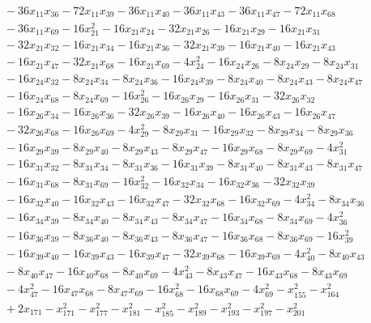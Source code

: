 \begin{align*}
&{}-36x_{11}x_{36} -72x_{11}x_{39} -36x_{11}x_{40} -36x_{11}x_{43} -36x_{11}x_{47} -72x_{11}x_{68} \\
&{}-36x_{11}x_{69} -16x_{21}^{2} -16x_{21}x_{24} -32x_{21}x_{26} -16x_{21}x_{29} -16x_{21}x_{31} \\
&{}-32x_{21}x_{32} -16x_{21}x_{34} -16x_{21}x_{36} -32x_{21}x_{39} -16x_{21}x_{40} -16x_{21}x_{43} \\
&{}-16x_{21}x_{47} -32x_{21}x_{68} -16x_{21}x_{69} -4x_{24}^{2} -16x_{24}x_{26} -8x_{24}x_{29} -8x_{24}x_{31} \\
&{}-16x_{24}x_{32} -8x_{24}x_{34} -8x_{24}x_{36} -16x_{24}x_{39} -8x_{24}x_{40} -8x_{24}x_{43} -8x_{24}x_{47} \\
&{}-16x_{24}x_{68} -8x_{24}x_{69} -16x_{26}^{2} -16x_{26}x_{29} -16x_{26}x_{31} -32x_{26}x_{32} \\
&{}-16x_{26}x_{34} -16x_{26}x_{36} -32x_{26}x_{39} -16x_{26}x_{40} -16x_{26}x_{43} -16x_{26}x_{47} \\
&{}-32x_{26}x_{68} -16x_{26}x_{69} -4x_{29}^{2} -8x_{29}x_{31} -16x_{29}x_{32} -8x_{29}x_{34} -8x_{29}x_{36} \\
&{}-16x_{29}x_{39} -8x_{29}x_{40} -8x_{29}x_{43} -8x_{29}x_{47} -16x_{29}x_{68} -8x_{29}x_{69} -4x_{31}^{2} \\
&{}-16x_{31}x_{32} -8x_{31}x_{34} -8x_{31}x_{36} -16x_{31}x_{39} -8x_{31}x_{40} -8x_{31}x_{43} -8x_{31}x_{47} \\
&{}-16x_{31}x_{68} -8x_{31}x_{69} -16x_{32}^{2} -16x_{32}x_{34} -16x_{32}x_{36} -32x_{32}x_{39} \\
&{}-16x_{32}x_{40} -16x_{32}x_{43} -16x_{32}x_{47} -32x_{32}x_{68} -16x_{32}x_{69} -4x_{34}^{2} -8x_{34}x_{36} \\
&{}-16x_{34}x_{39} -8x_{34}x_{40} -8x_{34}x_{43} -8x_{34}x_{47} -16x_{34}x_{68} -8x_{34}x_{69} -4x_{36}^{2} \\
&{}-16x_{36}x_{39} -8x_{36}x_{40} -8x_{36}x_{43} -8x_{36}x_{47} -16x_{36}x_{68} -8x_{36}x_{69} -16x_{39}^{2} \\
&{}-16x_{39}x_{40} -16x_{39}x_{43} -16x_{39}x_{47} -32x_{39}x_{68} -16x_{39}x_{69} -4x_{40}^{2} -8x_{40}x_{43} \\
&{}-8x_{40}x_{47} -16x_{40}x_{68} -8x_{40}x_{69} -4x_{43}^{2} -8x_{43}x_{47} -16x_{43}x_{68} -8x_{43}x_{69} \\
&{}-4x_{47}^{2} -16x_{47}x_{68} -8x_{47}x_{69} -16x_{68}^{2} -16x_{68}x_{69} -4x_{69}^{2} -x_{155}^{2} -x_{164}^{2} \\
&{}+2x_{171} -x_{171}^{2} -x_{177}^{2} -x_{181}^{2} -x_{185}^{2} -x_{189}^{2} -x_{193}^{2} -x_{197}^{2} -x_{201}^{2} \\

\end{align*}

